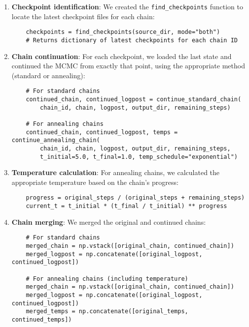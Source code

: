 \documentclass[11pt]{article}
\theoremstyle{definition}
\begin{document}
\begin{enumerate}
  \item \textbf{Checkpoint identification}: We created the \texttt{find\_checkpoints} function to locate the latest checkpoint files for each chain:
  
  \begin{verbatim}
    checkpoints = find_checkpoints(source_dir, mode="both")
    # Returns dictionary of latest checkpoints for each chain ID
  \end{verbatim}

  \item \textbf{Chain continuation}: For each checkpoint, we loaded the last state and continued the MCMC from exactly that point, using the appropriate method (standard or annealing):
  
  \begin{verbatim}
    # For standard chains
    continued_chain, continued_logpost = continue_standard_chain(
        chain_id, chain, logpost, output_dir, remaining_steps)
    
    # For annealing chains
    continued_chain, continued_logpost, temps = continue_annealing_chain(
        chain_id, chain, logpost, output_dir, remaining_steps,
        t_initial=5.0, t_final=1.0, temp_schedule="exponential")
  \end{verbatim}
  
  \item \textbf{Temperature calculation}: For annealing chains, we calculated the appropriate temperature based on the chain's progress:
  
  \begin{verbatim}
    progress = original_steps / (original_steps + remaining_steps)
    current_t = t_initial * (t_final / t_initial) ** progress
  \end{verbatim}
  
  \item \textbf{Chain merging}: We merged the original and continued chains:
  
  \begin{verbatim}
    # For standard chains
    merged_chain = np.vstack([original_chain, continued_chain])
    merged_logpost = np.concatenate([original_logpost, continued_logpost])
    
    # For annealing chains (including temperature)
    merged_chain = np.vstack([original_chain, continued_chain])
    merged_logpost = np.concatenate([original_logpost, continued_logpost])
    merged_temps = np.concatenate([original_temps, continued_temps])
  \end{verbatim}
  

\end{enumerate}
\end{document}
